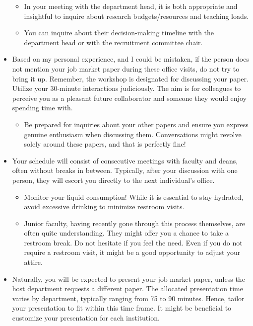 \documentclass[12pt]{article}
\begin{document}
\begin{itemize}
\begin{itemize}
\item In your meeting with the department head, it is both appropriate and insightful to inquire about research budgets/resources and teaching loads.
\item You can inquire about their decision-making timeline with the department head or with the recruitment committee chair.
\end{itemize}
\item Based on my personal experience, and I could be mistaken, if the person does not mention your job market paper during these office visits, do not try to bring it up. Remember, the workshop is designated for discussing your paper. Utilize your 30-minute interactions judiciously. The aim is for colleagues to perceive you as a pleasant future collaborator and someone they would enjoy spending time with.
\begin{itemize}
\item Be prepared for inquiries about your other papers and ensure you express genuine enthusiasm when discussing them. Conversations might revolve solely around these papers, and that is perfectly fine!
\end{itemize}
\item Your schedule will consist of consecutive meetings with faculty and deans, often without breaks in between. Typically, after your discussion with one person, they will escort you directly to the next individual's office.
\begin{itemize}
\item Monitor your liquid consumption! While it is essential to stay hydrated, avoid excessive drinking to minimize restroom visits.
\item Junior faculty, having recently gone through this process themselves, are often quite understanding. They might offer you a chance to take a restroom break. Do not hesitate if you feel the need. Even if you do not require a restroom visit, it might be a good opportunity to adjust your attire.
\end{itemize}
\item Naturally, you will be expected to present your job market paper, unless the host department requests a different paper. The allocated presentation time varies by department, typically ranging from 75 to 90 minutes. Hence, tailor your presentation to fit within this time frame. It might be beneficial to customize your presentation for each institution.
\begin{itemize}

\end{itemize}
\end{itemize}
\end{document}
